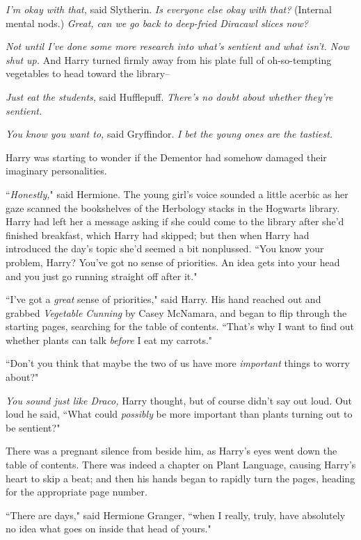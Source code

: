 \emph{I'm okay with that,} said Slytherin. \emph{Is everyone else okay with that?} (Internal mental nods.) \emph{Great, can we go back to deep-fried Diracawl slices now?}

\emph{Not until I've done some more research into what's sentient and what isn't. Now shut up.} And Harry turned firmly away from his plate full of oh-so-tempting vegetables to head toward the library\---

\emph{Just eat the students,} said Hufflepuff. \emph{There's no doubt about whether \emph{they're} sentient.}

\emph{You know you want to,} said Gryffindor. \emph{I bet the young ones are the tastiest.}

Harry was starting to wonder if the Dementor had somehow damaged their imaginary personalities.

\later

``\emph{Honestly,}" said Hermione. The young girl's voice sounded a little acerbic as her gaze scanned the bookshelves of the Herbology stacks in the Hogwarts library. Harry had left her a message asking if she could come to the library after she'd finished breakfast, which Harry had skipped; but then when Harry had introduced the day's topic she'd seemed a bit nonplussed. ``You know your problem, Harry? You've got no sense of priorities. An idea gets into your head and you just go running straight off after it."

``I've got a \emph{great} sense of priorities," said Harry. His hand reached out and grabbed \emph{Vegetable Cunning} by Casey McNamara, and began to flip through the starting pages, searching for the table of contents. ``That's why I want to find out whether plants can talk \emph{before} I eat my carrots."

``Don't you think that maybe the two of us have more \emph{important} things to worry about?"

\emph{You sound just like Draco,} Harry thought, but of course didn't say out loud. Out loud he said, ``What could \emph{possibly} be more important than plants turning out to be sentient?"

There was a pregnant silence from beside him, as Harry's eyes went down the table of contents. There was indeed a chapter on Plant Language, causing Harry's heart to skip a beat; and then his hands began to rapidly turn the pages, heading for the appropriate page number.

``There are days," said Hermione Granger, ``when I really, truly, have absolutely no idea what goes on inside that head of yours."

